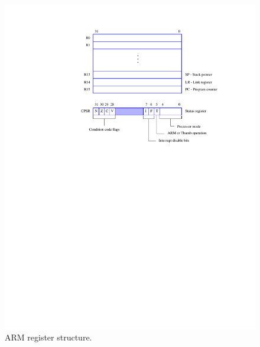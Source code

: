 \documentclass[11pt, twoside, pdftex]{article}
\begin{document}
\begin{figure}[H]
   \begin{center}
      \includegraphics[scale=1]{figures/figure1.pdf}
   \caption{ARM register structure.} 
	 \label{fig:1}
	 \end{center}
\end{figure}
\end{document}
